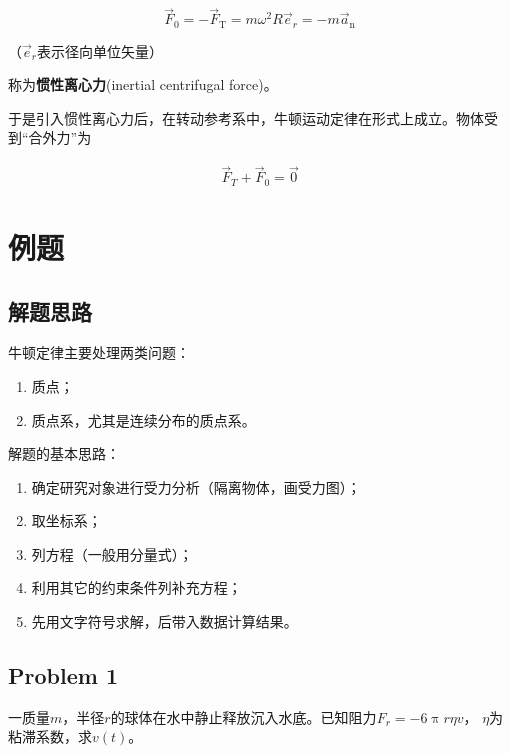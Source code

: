 \documentclass[
	12pt, %
	a4paper, %
]{myLegrandOrangeBook}
\begin{document}
    \begin{equation}
        \overrightarrow{F}_0=-\overrightarrow{F}_{\mathrm{T}}=m \omega^2 R \overrightarrow{e}_r=-m \overrightarrow{a}_{\mathrm{n}}
    \end{equation}

    （\(\overrightarrow{e}_r\)表示径向单位矢量）

    称为\textbf{惯性离心力}(inertial centrifugal force)。

    于是引入惯性离心力后，在转动参考系中，牛顿运动定律在形式上成立。物体受到“合外力”为

    \begin{align*}
        \overrightarrow{F}_{T} + \overrightarrow{F}_{0} = \overrightarrow{0}
    \end{align*}

\section{例题}

\subsection{解题思路}

    牛顿定律主要处理两类问题：

    \begin{enumerate}
        \item 质点；
        \item 质点系，尤其是连续分布的质点系。
    \end{enumerate}

    解题的基本思路：

    \begin{enumerate}
        \item 确定研究对象进行受力分析（隔离物体，画受力图）；
        \item 取坐标系；
        \item 列方程（一般用分量式）；
        \item 利用其它的约束条件列补充方程；
        \item 先用文字符号求解，后带入数据计算结果。
    \end{enumerate}

\subsection{Problem 1}

    一质量\(m\)，半径\(r\)的球体在水中静止释放沉入水底。已知阻力\(F_{r} = - 6 \uppi r \eta v\)，
    \(\eta\)为粘滞系数，求\(v\left(t\right)\)。
    \vspace{1em}
\end{document}
